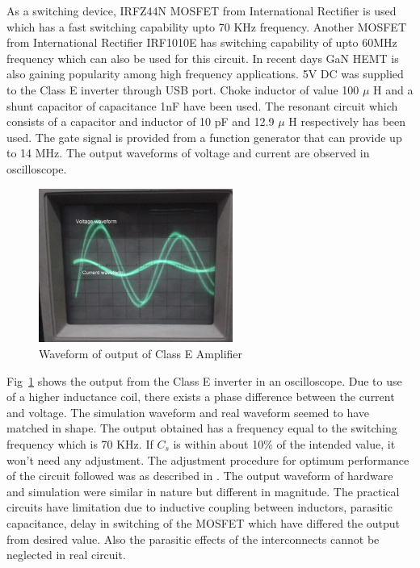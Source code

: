 \documentclass[journal,twoside]{IEEEtran}
\begin{document}
As a switching device, IRFZ44N MOSFET from International
Rectifier is used which has a fast switching capability upto 70
KHz frequency. Another MOSFET from International
Rectifier IRF1010E has switching capability of upto 60MHz
frequency which can also be used for this circuit. In recent
days GaN HEMT is also gaining popularity among high
frequency applications. 5V DC was supplied to the Class E
inverter through USB port. Choke inductor of value 100 $\mu$ H
and a shunt capacitor of capacitance 1nF have been used. The
resonant circuit which consists of a capacitor and inductor of
10 pF and 12.9 $\mu$ H respectively has been used. The gate
signal is provided from a function generator that can provide
up to 14 MHz. The output waveforms of voltage and current
are observed in oscilloscope.




\begin{figure}[!ht]
\centering
\includegraphics[width=2.5in]{6}
\caption{Waveform of output of Class E Amplifier}
\label{fig_6}
\end{figure}

Fig~\ref{fig_6} shows the output from the Class E inverter in an
oscilloscope. Due to use of a higher inductance coil, there
exists a phase difference between the current and voltage. The
simulation waveform and real waveform seemed to have
matched in shape. The output obtained has a frequency equal
to the switching frequency which is 70 KHz. If $C_s$ is within
about 10\% of the intended value, it won't need any
adjustment. The adjustment procedure for optimum
performance of the circuit followed was as described in \cite{Sokal2001}.
The output waveform of hardware and simulation were
similar in nature but different in magnitude. The practical
circuits have limitation due to inductive coupling between
inductors, parasitic capacitance, delay in switching of the
MOSFET which have differed the output from desired value.
Also the parasitic effects of the interconnects cannot be
neglected in real circuit.
\end{document}
